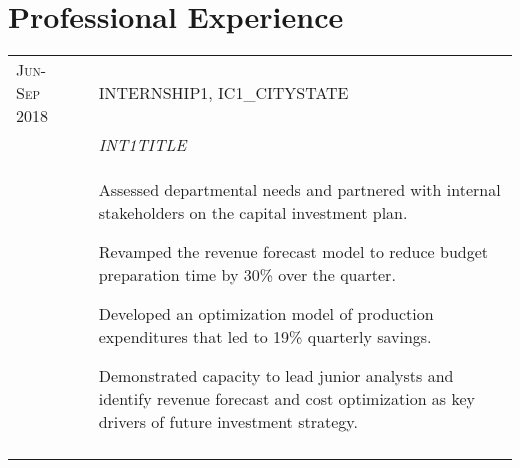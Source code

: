 \documentclass[a4paper,10pt]{article}
\begin{document}
\section{Professional Experience}
\begin{supertabular}{l p{0.55cm} p{13.9cm}}


	\textsc{Jun-Sep 2018}	&& \textsc{INTERNSHIP1}, IC1_CITYSTATE \\
												&& \small	\emph{INT1TITLE} \\
												&& \begin{enumerate*}[label =$\diamond$, itemjoin={\newline}]
                            \item \footnotesize Assessed departmental needs and partnered with internal stakeholders on the capital investment plan.
  													\item \footnotesize Revamped the revenue forecast model to reduce budget preparation time by 30\% over the quarter.
														\item \footnotesize Developed an optimization model of production expenditures that led to 19\% quarterly savings.
  		                      \item \footnotesize Demonstrated capacity to lead junior analysts and identify revenue forecast and cost optimization as key drivers of future investment strategy.
													\end{enumerate*} \\
	 \\





\end{supertabular}
\end{document}
